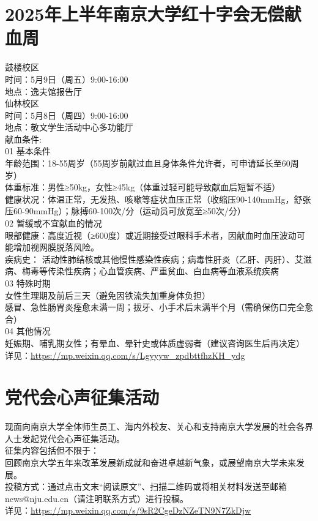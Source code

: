 \documentclass[letterpaper, 12pt]{article}
\begin{document}
\begin{multicols}{2}
\section{2025年上半年南京大学红十字会无偿献血周} %
鼓楼校区
\\时间：5月9日（周五）9:00-16:00 
\\地点：逸夫馆报告厅
\\仙林校区
\\时间：5月8日（周四）9:00-16:00 
\\地点：敬文学生活动中心多功能厅
\\献血条件:
\\01 基本条件
\\年龄范围：18-55周岁（55周岁前献过血且身体条件允许者，可申请延长至60周岁）
\\体重标准：男性≥50kg，女性≥45kg（体重过轻可能导致献血后短暂不适）
\\健康状况：体温正常，无发热、咳嗽等症状血压正常（收缩压90-140mmHg，舒张压60-90mmHg）；脉搏60-100次/分（运动员可放宽至≥50次/分）
\\02 暂缓或不宜献血的情况
\\眼部健康：高度近视（≥600度）或近期接受过眼科手术者，因献血时血压波动可能增加视网膜脱落风险。 
\\疾病史： 活动性肺结核或其他慢性感染性疾病；病毒性肝炎（乙肝、丙肝）、艾滋病、梅毒等传染性疾病；心血管疾病、严重贫血、白血病等血液系统疾病
\\03 特殊时期
\\女性生理期及前后三天（避免因铁流失加重身体负担）
\\感冒、急性肠胃炎痊愈未满一周；拔牙、小手术后未满半个月（需确保伤口完全愈合）
\\04 其他情况
\\妊娠期、哺乳期女性；有晕血、晕针史或体质虚弱者（建议咨询医生后再决定）
\\详见：\url{https://mp.weixin.qq.com/s/Lgyyyw_zpdbttfhzKH_ydg}

\section{党代会心声征集活动} %
现面向南京大学全体师生员工、海内外校友、关心和支持南京大学发展的社会各界人士发起党代会心声征集活动。
\\征集内容包括但不限于：
\\回顾南京大学五年来改革发展新成就和奋进卓越新气象，或展望南京大学未来发展。
\\投稿方式：通过点击文末“阅读原文”、扫描二维码或将相关材料发送至邮箱news@nju.edu.cn（请注明联系方式）进行投稿。
\\详见：\url{https://mp.weixin.qq.com/s/9sR2CgeDzNZeTN9N7ZkDjw}


\end{multicols}
\end{document}
